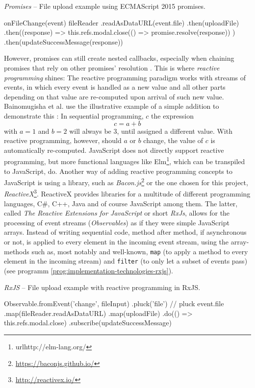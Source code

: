 \begin{program}
\caption{\emph{Promises} -- File upload example using ECMAScript 2015 promises.}
\label{prog:implementation-technologies-rxjs-promises}
\begin{JsCode}
onFileChange(event) {
  fileReader
    .readAsDataURL(event.file)
    .then(uploadFile)
    .then((response) => {
      this.refs.modal.close(() => promise.resolve(response))
    })
    .then(updateSuccessMessage(response))
}
\end{JsCode}
\end{program}

However, promises can still create nested callbacks, especially when chaining promises that rely on other promises' resolution \cite{reactive-vs-promises}. This is where \emph{reactive programming} shines: The reactive programming paradigm works with streams of events, in which every event is handled as a new value and all other parts depending on that value are re-computed upon arrival of such new value. Bainomugisha et al. use the illustrative example of a simple addition to demonstrate this \cite{reactive-programming-survey}: In sequential programming, $c$ the expression
%
$$c = a + b$$
%
with $a = 1$ and $b = 2$ will always be $3$, until assigned a different value. With reactive programming, however, should $a$ or $b$ change, the value of $c$ is automatically re-computed.
JavaScript does not directly support reactive programming, but more functional languages like Elm\footnote{url{http://elm-lang.org/}}, which can be transpiled to JavaScript, do. Another way of adding reactive programming concepts to JavaScript is using a library, such as \emph{Bacon.js}\footnote{\url{https://baconjs.github.io/}} or the one chosen for this project, \emph{ReactiveX}\footnote{\url{http://reactivex.io/}}. ReactiveX provides libraries for a multitude of different programming languages, C#, C++, Java and of course JavaScript among them. The latter, called \emph{The Reactive Extensions for JavaScript} or short \emph{RxJs}, allows for the processing of event streams (\emph{Observables}) as if they were simple JavaScript arrays. Instead of writing sequential code, method after method, if asynchronous or not, is applied to every element in the incoming event stream, using the array-methods such as, most notably and well-known, \texttt{map} (to apply a method to every element in the incoming stream) and \texttt{filter} (to only let a subset of events pass) (see programm \ref{prog:implementation-technologies-rxjs}).

\begin{program}
\caption{\emph{RxJS} -- File upload example with reactive programming in RxJS.}
\label{prog:implementation-technologies-rxjs}
\begin{JsCode}
Observable.fromEvent('change', fileInput)
  .pluck('file') // pluck event.file
  .map(fileReader.readAsDataURL)
  .map(uploadFile)
  .do(() => this.refs.modal.close)
  .subscribe(updateSuccessMessage)
\end{JsCode}
\end{program}

